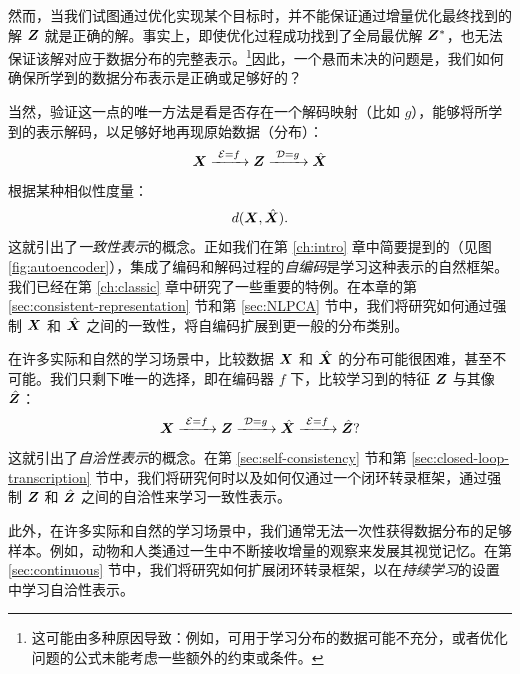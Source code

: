 \documentclass[../../book-main.tex]{subfiles}
\begin{document}
然而，当我们试图通过优化实现某个目标时，并不能保证通过增量优化最终找到的解 $\bm{Z}$ 就是正确的解。事实上，即使优化过程成功找到了全局最优解 $\bm{Z}^*$，也无法保证该解对应于数据分布的完整表示。\footnote{这可能由多种原因导致：例如，可用于学习分布的数据可能不充分，或者优化问题的公式未能考虑一些额外的约束或条件。}因此，一个悬而未决的问题是，我们如何确保所学到的数据分布表示是正确或足够好的？

当然，验证这一点的唯一方法是看是否存在一个解码映射（比如 $g$），能够将所学到的表示解码，以足够好地再现原始数据（分布）：
\begin{equation}
  \bm{X}
  \xrightarrow{\hspace{1mm} \mathcal{E} = f \hspace{1mm}} \bm{Z}
  \xrightarrow{\hspace{1mm} \mathcal{D} = g \hspace{1mm}} \hat{\bm{X}}
\end{equation}
根据某种相似性度量：
\begin{equation}
  d(\bm{X}, \hat {\bm{X}}).
\end{equation}
这就引出了{\em 一致性表示}的概念。正如我们在第 \ref{ch:intro} 章中简要提到的（见图 \ref{fig:autoencoder}），集成了编码和解码过程的{\em 自编码}是学习这种表示的自然框架。我们已经在第 \ref{ch:classic} 章中研究了一些重要的特例。在本章的第 \ref{sec:consistent-representation} 节和第 \ref{sec:NLPCA} 节中，我们将研究如何通过强制 $\bm{X}$ 和 $\hat {\bm{X}}$ 之间的一致性，将自编码扩展到更一般的分布类别。

在许多实际和自然的学习场景中，比较数据 $\bm{X}$ 和 $\hat {\bm{X}}$ 的分布可能很困难，甚至不可能。我们只剩下唯一的选择，即在编码器 $f$ 下，比较学习到的特征 $\bm{Z}$ 与其像 $\hat {\bm{Z}}$：
\begin{equation}
 \bm{X}
\xrightarrow{\hspace{1mm} \mathcal{E} = f \hspace{1mm}} \bm{Z}  \xrightarrow{\hspace{1mm} \mathcal{D} = g \hspace{1mm}} \hat{\bm{X}} \xrightarrow{\hspace{1mm} \mathcal{E} = f \hspace{1mm}} \hat {\bm{Z}}?
\label{eqn:closed-autoencoding}
\end{equation}
这就引出了{\em 自洽性表示}的概念。在第 \ref{sec:self-consistency} 节和第 \ref{sec:closed-loop-transcription} 节中，我们将研究何时以及如何仅通过一个闭环转录框架，通过强制 $\bm{Z}$ 和 $\hat {\bm{Z}}$ 之间的自洽性来学习一致性表示。

此外，在许多实际和自然的学习场景中，我们通常无法一次性获得数据分布的足够样本。例如，动物和人类通过一生中不断接收增量的观察来发展其视觉记忆。在第 \ref{sec:continuous} 节中，我们将研究如何扩展闭环转录框架，以在{\em 持续学习}的设置中学习自洽性表示。
\end{document}
